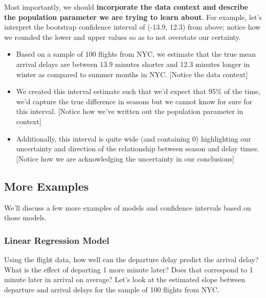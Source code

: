 \documentclass[
]{book}
\newenvironment{Shaded}{\begin{snugshade}}{\end{snugshade}}
\newcommand{\KeywordTok}[1]{\textcolor[rgb]{0.13,0.29,0.53}{\textbf{#1}}}
\newcommand{\NormalTok}[1]{#1}
\newcommand{\OperatorTok}[1]{\textcolor[rgb]{0.81,0.36,0.00}{\textbf{#1}}}
\newcommand{\StringTok}[1]{\textcolor[rgb]{0.31,0.60,0.02}{#1}}
\providecommand{\tightlist}{%
  \setlength{\itemsep}{0pt}\setlength{\parskip}{0pt}}
\begin{document}
Most importantly, we should \textbf{incorporate the data context and describe the population parameter we are trying to learn about}. For example, let's interpret the bootstrap confidence interval of (-13.9, 12.3) from above; notice how we rounded the lower and upper values so as to not overstate our certainty.

\begin{itemize}
\tightlist
\item
  Based on a sample of 100 flights from NYC, we estimate that the true mean arrival delays are between 13.9 minutes shorter and 12.3 minutes longer in winter as compared to summer months in NYC. {[}Notice the data context{]}
\item
  We created this interval estimate such that we'd expect that 95\% of the time, we'd capture the true difference in seasons but we cannot know for sure for this interval. {[}Notice how we've written out the population parameter in context{]}
\item
  Additionally, this interval is quite wide (and containing 0) highlighting our uncertainty and direction of the relationship between season and delay times. {[}Notice how we are acknowledging the uncertainty in our conclusions{]}
\end{itemize}

\hypertarget{more-examples}{%
\subsection{More Examples}\label{more-examples}}

We'll discuss a few more examples of models and confidence intervals based on those models.

\hypertarget{linear-regression-model}{%
\subsubsection{Linear Regression Model}\label{linear-regression-model}}

Using the flight data, how well can the departure delay predict the arrival delay? What is the effect of departing 1 more minute later? Does that correspond to 1 minute later in arrival on average? Let's look at the estimated slope between departure and arrival delays for the sample of 100 flights from NYC.

\begin{Shaded}
\end{Shaded}
\end{document}
